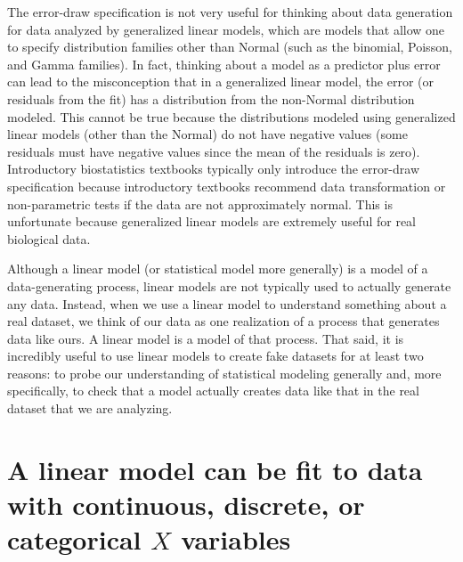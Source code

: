 \documentclass[]{book}
\begin{document}
The error-draw specification is not very useful for thinking about data generation for data analyzed by generalized linear models, which are models that allow one to specify distribution families other than Normal (such as the binomial, Poisson, and Gamma families). In fact, thinking about a model as a predictor plus error can lead to the misconception that in a generalized linear model, the error (or residuals from the fit) has a distribution from the non-Normal distribution modeled. This cannot be true because the distributions modeled using generalized linear models (other than the Normal) do not have negative values (some residuals must have negative values since the mean of the residuals is zero). Introductory biostatistics textbooks typically only introduce the error-draw specification because introductory textbooks recommend data transformation or non-parametric tests if the data are not approximately normal. This is unfortunate because generalized linear models are extremely useful for real biological data.

Although a linear model (or statistical model more generally) is a model of a data-generating process, linear models are not typically used to actually generate any data. Instead, when we use a linear model to understand something about a real dataset, we think of our data as one realization of a process that generates data like ours. A linear model is a model of that process. That said, it is incredibly useful to use linear models to create fake datasets for at least two reasons: to probe our understanding of statistical modeling generally and, more specifically, to check that a model actually creates data like that in the real dataset that we are analyzing.

\hypertarget{a-linear-model-can-be-fit-to-data-with-continuous-discrete-or-categorical-x-variables}{%
\section{\texorpdfstring{A linear model can be fit to data with continuous, discrete, or categorical \(X\) variables}{A linear model can be fit to data with continuous, discrete, or categorical X variables}}\label{a-linear-model-can-be-fit-to-data-with-continuous-discrete-or-categorical-x-variables}}
\end{document}

